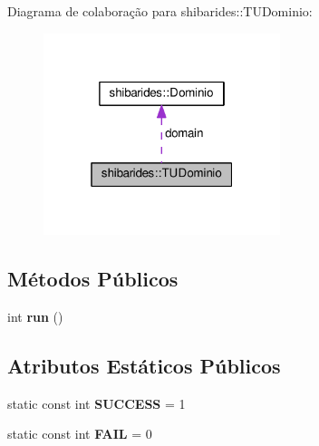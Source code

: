 Diagrama de colaboração para shibarides\+:\+:T\+U\+Dominio\+:\nopagebreak
\begin{figure}[H]
\begin{center}
\leavevmode
\includegraphics[width=196pt]{classshibarides_1_1TUDominio__coll__graph}
\end{center}
\end{figure}
\subsection*{Métodos Públicos}
\begin{DoxyCompactItemize}
\item 
int {\bfseries run} ()\hypertarget{classshibarides_1_1TUDominio_a3ed6438c91e763541b289e352d9d0d9d}{}\label{classshibarides_1_1TUDominio_a3ed6438c91e763541b289e352d9d0d9d}

\end{DoxyCompactItemize}
\subsection*{Atributos Estáticos Públicos}
\begin{DoxyCompactItemize}
\item 
static const int {\bfseries S\+U\+C\+C\+E\+SS} = 1\hypertarget{classshibarides_1_1TUDominio_aaed9469af819def9a9f2117e6c72d8b4}{}\label{classshibarides_1_1TUDominio_aaed9469af819def9a9f2117e6c72d8b4}

\item 
static const int {\bfseries F\+A\+IL} = 0\hypertarget{classshibarides_1_1TUDominio_a93c02894a2f820b9d2cefe501a2f06f5}{}\label{classshibarides_1_1TUDominio_a93c02894a2f820b9d2cefe501a2f06f5}

\end{DoxyCompactItemize}
